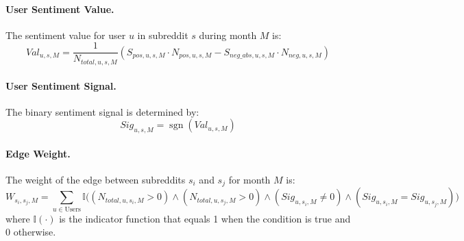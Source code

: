 \documentclass{article}
\theoremstyle{definition}
\begin{document}
\paragraph{User Sentiment Value.} The sentiment value for user $u$ in subreddit $s$ during month $M$ is:
\begin{equation}
Val_{u,s,M} = \frac{1}{N_{total,u,s,M}} \left( S_{pos,u,s,M} \cdot N_{pos,u,s,M} - S_{neg\_abs,u,s,M} \cdot N_{neg,u,s,M} \right)
\end{equation}

\paragraph{User Sentiment Signal.} The binary sentiment signal is determined by:
\begin{equation}
Sig_{u,s,M} = \operatorname{sgn}(Val_{u,s,M})
\end{equation}

\paragraph{Edge Weight.} The weight of the edge between subreddits $s_i$ and $s_j$ for month $M$ is:
\begin{equation}
W_{s_i,s_j,M} = \sum_{u \in \text{Users}} \mathbb{I}\Big( (N_{total,u,s_i,M} > 0) \land (N_{total,u,s_j,M} > 0) \land (Sig_{u,s_i,M} \neq 0) \land (Sig_{u,s_i,M} = Sig_{u,s_j,M}) \Big)
\end{equation}
where $\mathbb{I}(\cdot)$ is the indicator function that equals 1 when the condition is true and 0 otherwise.




\end{document}
